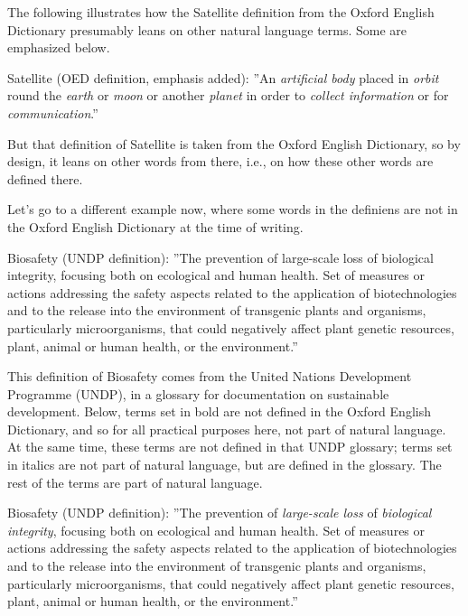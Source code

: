 \documentclass[graybox,envcountchap,sectrefs]{svmono}
\begin{document}
The following illustrates how the Satellite definition from the Oxford English Dictionary presumably leans on other natural language terms. Some are emphasized below.

\begin{svgraybox}
Satellite (OED definition, emphasis added): ''An \textit{artificial body} placed in \textit{orbit} round the \textit{earth} or \textit{moon} or another \textit{planet} in order to \textit{collect information} or for \textit{communication}.'' \cite{def-satellite}
\end{svgraybox}

But that definition of Satellite is taken from the Oxford English Dictionary, so by design, it leans on other words from there, i.e., on how these other words are defined there.

Let's go to a different example now, where some words in the definiens are not in the Oxford English Dictionary at the time of writing.

\begin{svgraybox}
Biosafety (UNDP definition): ''The prevention of large-scale loss of biological integrity, focusing both on ecological and human health. Set of measures or actions addressing the safety aspects related to the application of biotechnologies and to the release into the environment of transgenic plants and organisms, particularly microorganisms, that could negatively affect plant genetic resources, plant, animal or human health, or the environment.'' \cite{undp-glossary}
\end{svgraybox}

This definition of Biosafety comes from the United Nations Development Programme (UNDP), in a glossary for documentation on sustainable development. Below, terms set in bold are not defined in the Oxford English Dictionary, and so for all practical purposes here, not part of natural language. At the same time, these terms are not defined in that UNDP glossary; terms set in italics are not part of natural language, but are defined in the glossary. The rest of the terms are part of natural language.

\begin{svgraybox}
Biosafety (UNDP definition): ''The prevention of \textit{large-scale loss} of \textit{biological integrity}, focusing both on ecological and human health. Set of measures or actions addressing the safety aspects related to the application of biotechnologies and to the release into the environment of transgenic plants and organisms, particularly microorganisms, that could negatively affect plant genetic resources, plant, animal or human health, or the environment.'' \cite{undp-glossary}
\end{svgraybox}
\end{document}
